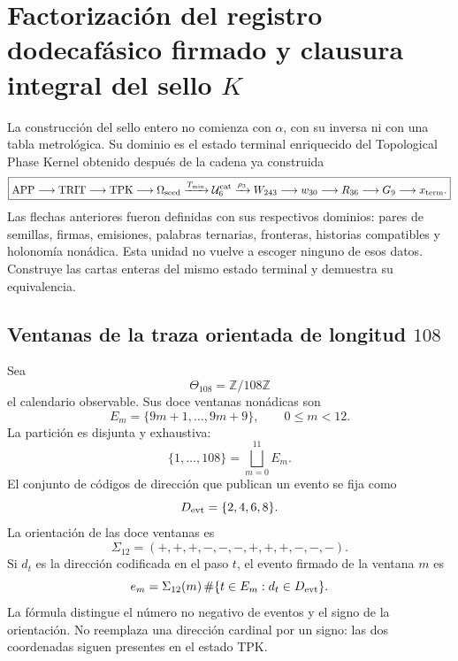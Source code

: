 
\section{Factorización del registro dodecafásico firmado y clausura integral del sello \(K\)}
\label{p3-83-c25-s4:chap:registro-dodecafasico-hadamard-k}

La construcción del sello entero no comienza con \(\alpha\), con su inversa
ni con una tabla metrológica. Su dominio es el estado terminal enriquecido
del Topological Phase Kernel obtenido después de la cadena ya construida
\begin{equation}
 \boxed{
 \mathrm{APP}\longrightarrow\mathrm{TRIT}\longrightarrow\mathrm{TPK}
 \longrightarrow\Omega_{\rm seed}
 \xrightarrow{T_{\min}}\mathcal U_6^{\rm cat}
 \xrightarrow{\rho_3}W_{243}
 \longrightarrow w_{30}\longrightarrow R_{36}
 \longrightarrow G_9\longrightarrow x_{\rm term}.}
 \label{p3-83-c25-s4:eq:cadena-upstream-registro-dodecafasico}
\end{equation}
Las flechas anteriores fueron definidas con sus respectivos dominios:
pares de semillas, firmas, emisiones, palabras ternarias, fronteras,
historias compatibles y holonomía nonádica. Esta unidad no vuelve a escoger
ninguno de esos datos. Construye las cartas enteras del mismo estado
terminal y demuestra su equivalencia.

\subsection{Ventanas de la traza orientada de longitud \(108\)}

Sea
\[
 \Theta_{108}=\mathbb Z/108\mathbb Z
\]
el calendario observable. Sus doce ventanas nonádicas son
\[
 E_m=\{9m+1,\ldots,9m+9\},
 \qquad 0\leq m<12.
\]
La partición es disjunta y exhaustiva:
\[
 \{1,\ldots,108\}=\bigsqcup_{m=0}^{11}E_m.
\]
El conjunto de códigos de dirección que publican un evento se fija como
\[
 D_{\rm evt}=\{2,4,6,8\}.
\]
La orientación de las doce ventanas es
\begin{equation}
 \Sigma_{12}=(+,+,+,-,-,-,+,+,+,-,-,-).
 \label{p3-83-c25-s4:eq:signatura-doce-ventanas}
\end{equation}
Si \(d_t\) es la dirección codificada en el paso \(t\), el evento firmado
de la ventana \(m\) es
\begin{equation}
 e_m=\Sigma_{12}(m)\,
 \#\{t\in E_m:d_t\in D_{\rm evt}\}.
 \label{p3-83-c25-s4:eq:evento-firmado-ventana}
\end{equation}
La fórmula distingue el número no negativo de eventos y el signo de la
orientación. No reemplaza una dirección cardinal por un signo: las dos
coordenadas siguen presentes en el estado TPK.

